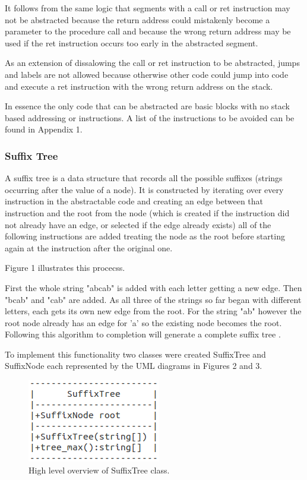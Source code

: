 \documentclass[9pt,nocopyrightspace]{sigplanconf}
\begin{document}
It follows from the same logic that segments with a call or ret instruction may not be abstracted because the return address could mistakenly become a parameter to the procedure call and because the wrong return address may be used if the ret instruction occurs too early in the abstracted segment.

As an extension of dissalowing the call or ret instruction to be abstracted, jumps and labels are not allowed because otherwise other code could jump into code and execute a ret instruction with the wrong return address on the stack.

In essence the only code that can be abstracted are basic blocks with no stack based addressing or instructions.
A list of the instructions to be avoided can be found in Appendix 1.

\subsubsection{Suffix Tree}

A suffix tree is a data structure that records all the possible suffixes (strings occurring after the value of a node).
It is constructed by iterating over every instruction in the abstractable code and creating an edge between that instruction and the root from the node (which is created if the instruction did not already have an edge, or selected if the edge already exists) all of the following instructions are added treating the node as the root before starting again at the instruction after the original one.

Figure 1 illustrates this procecss.

First the whole string "abcab" is added with each letter getting a new edge.
Then "bcab" and "cab" are added.
As all three of the strings so far began with different letters, each gets its own new edge from the root.
For the string "ab" however the root node already has an edge for 'a' so the existing node becomes the root.
Following this algorithm to completion will generate a complete suffix tree \cite{ctci01}.

To implement this functionality two classes were created SuffixTree and SuffixNode each represented by the UML diagrams in Figures 2 and 3. 

\begin{figure}
\begin{center}
\includegraphics{tree}
\caption{High level overview of SuffixTree class.}
\end{center}
\end{figure}
\end{document}

